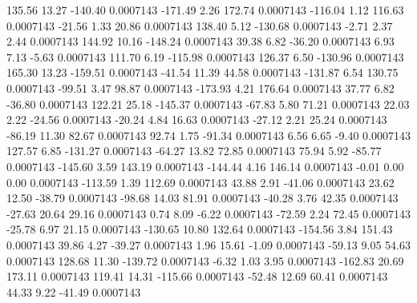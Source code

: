       135.56       13.27     -140.40     0.0007143
     -171.49        2.26      172.74     0.0007143
     -116.04        1.12      116.63     0.0007143
      -21.56        1.33       20.86     0.0007143
      138.40        5.12     -130.68     0.0007143
       -2.71        2.37        2.44     0.0007143
      144.92       10.16     -148.24     0.0007143
       39.38        6.82      -36.20     0.0007143
        6.93        7.13       -5.63     0.0007143
      111.70        6.19     -115.98     0.0007143
      126.37        6.50     -130.96     0.0007143
      165.30       13.23     -159.51     0.0007143
      -41.54       11.39       44.58     0.0007143
     -131.87        6.54      130.75     0.0007143
      -99.51        3.47       98.87     0.0007143
     -173.93        4.21      176.64     0.0007143
       37.77        6.82      -36.80     0.0007143
      122.21       25.18     -145.37     0.0007143
      -67.83        5.80       71.21     0.0007143
       22.03        2.22      -24.56     0.0007143
      -20.24        4.84       16.63     0.0007143
      -27.12        2.21       25.24     0.0007143
      -86.19       11.30       82.67     0.0007143
       92.74        1.75      -91.34     0.0007143
        6.56        6.65       -9.40     0.0007143
      127.57        6.85     -131.27     0.0007143
      -64.27       13.82       72.85     0.0007143
       75.94        5.92      -85.77     0.0007143
     -145.60        3.59      143.19     0.0007143
     -144.44        4.16      146.14     0.0007143
       -0.01        0.00        0.00     0.0007143
     -113.59        1.39      112.69     0.0007143
       43.88        2.91      -41.06     0.0007143
       23.62       12.50      -38.79     0.0007143
      -98.68       14.03       81.91     0.0007143
      -40.28        3.76       42.35     0.0007143
      -27.63       20.64       29.16     0.0007143
        0.74        8.09       -6.22     0.0007143
      -72.59        2.24       72.45     0.0007143
      -25.78        6.97       21.15     0.0007143
     -130.65       10.80      132.64     0.0007143
     -154.56        3.84      151.43     0.0007143
       39.86        4.27      -39.27     0.0007143
        1.96       15.61       -1.09     0.0007143
      -59.13        9.05       54.63     0.0007143
      128.68       11.30     -139.72     0.0007143
       -6.32        1.03        3.95     0.0007143
     -162.83       20.69      173.11     0.0007143
      119.41       14.31     -115.66     0.0007143
      -52.48       12.69       60.41     0.0007143
       44.33        9.22      -41.49     0.0007143
